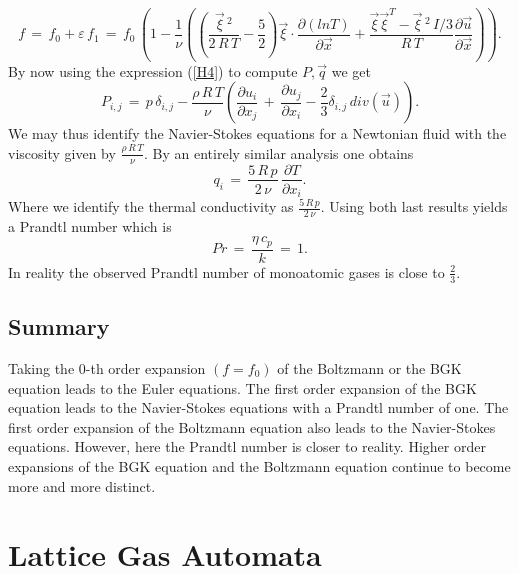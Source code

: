 \begin{equation}
 f \,=\, f_0 + \varepsilon \,  f_1 \,=\,  f_0  \, \left( 1- \frac{1}{ \nu}  \left(  \left( \frac{\vec \xi\,^2}{2\,R\,T} - \frac{5}{2}\right) \vec \xi \cdot\frac{\partial{(lnT)}}{\partial{\vec x}} + \frac{ \vec \xi \vec \xi^T - \vec \xi\,^2 \, I /3}{R\,T} \frac{\partial{\vec u}}{\partial{\vec x}} \right)\right) .\label{H4}
\end{equation}
By now using the expression (\ref{H4}) to compute $P, \vec q$ we get
\begin{equation}
 P_{i,j} \,=\,  p \, \delta_{i,j} - \frac{\rho \, R \, T}{ \nu}  \left( \frac{\partial{u_i}}{\partial{x_j}} \, + \,\frac{\partial{u_j}}{\partial{x_i}} - \frac{2}{3} \delta_{i,j} \, div(\vec u)\right) .\nonumber
\end{equation}
We may thus identify the Navier-Stokes equations for a Newtonian fluid with the viscosity given by $\frac{\rho \, R \, T}{ \nu}$. By an entirely similar analysis one obtains
\begin{equation}
 q_i \,=\,   \frac{5 \, R \, p}{ 2 \, \nu}  \, \frac{\partial{T}}{\partial{x_i}}  .\nonumber
\end{equation}
Where we identify the thermal conductivity as $\frac{5 \, R \, p}{ 2 \, \nu} $. Using both last results yields a Prandtl number which is
\begin{equation}
 Pr \,=\,   \frac{\eta \, c_p}{ k}  \,=\, 1 .\nonumber
\end{equation}
In reality the observed Prandtl number of monoatomic gases is close to $\frac{2}{3}$.
\subsection{Summary}
Taking the $0$-th order expansion $(f=f_0)$ of the Boltzmann or the BGK equation leads to the Euler equations. The first order expansion of the BGK equation leads to the Navier-Stokes equations with a Prandtl number of one. The first order expansion of the Boltzmann equation also leads to the Navier-Stokes equations. However, here the Prandtl number is closer to reality. Higher order expansions of the BGK equation and the Boltzmann equation continue to become more and more distinct.

\section{Lattice Gas Automata}

